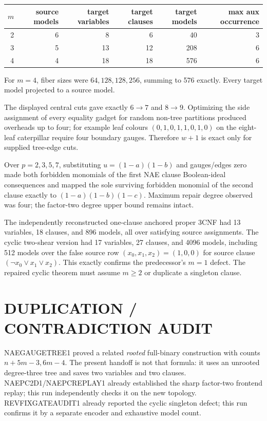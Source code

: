 \documentclass[11pt]{article}
\begin{document}
\begin{center}
\begin{tabular}{rrrrrr}
\toprule
$m$ & source models & target variables & target clauses & target models & max aux occurrence\\
\midrule
2&6&8&6&40&3\\
3&5&13&12&208&6\\
4&4&18&18&576&6\\
\bottomrule
\end{tabular}
\end{center}
For $m=4$, fiber sizes were $64,128,128,256$, summing to 576 exactly.  Every target model projected to a source model.

The displayed central cuts gave exactly $6\to7$ and $8\to9$.  Optimizing the side assignment of every equality gadget for random non-tree partitions produced overheads up to four; for example leaf colours $(0,1,0,1,1,0,1,0)$ on the eight-leaf caterpillar require four boundary gauges.  Therefore $w+1$ is exact only for supplied tree-edge cuts.

Over $p=2,3,5,7$, substituting $u=(1-a)(1-b)$ and gauges/edges zero made both forbidden monomials of the first NAE clause Boolean-ideal consequences and mapped the sole surviving forbidden monomial of the second clause exactly to $(1-a)(1-b)(1-c)$.  Maximum repair degree observed was four; the factor-two degree upper bound remains intact.

The independently reconstructed one-clause anchored proper 3CNF had 13 variables, 18 clauses, and 896 models, all over satisfying source assignments.  The cyclic two-shear version had 17 variables, 27 clauses, and 4096 models, including 512 models over the false source row $(x_0,x_1,x_2)=(1,0,0)$ for source clause $(\neg x_0\vee x_1\vee x_2)$.  This exactly confirms the predecessor's $m=1$ defect.  The repaired cyclic theorem must assume $m\ge2$ or duplicate a singleton clause.

\section*{DUPLICATION / CONTRADICTION AUDIT}
NAEGAUGETREE1 proved a related \emph{rooted} full-binary construction with counts $n+5m-3,6m-4$.  The present handoff is not that formula: it uses an unrooted degree-three tree and saves two variables and two clauses.  NAEPC2D1/NAEPCREPLAY1 already established the sharp factor-two frontend replay; this run independently checks it on the new topology.  REVFIXGATEAUDIT1 already reported the cyclic singleton defect; this run confirms it by a separate encoder and exhaustive model count.
\end{document}
